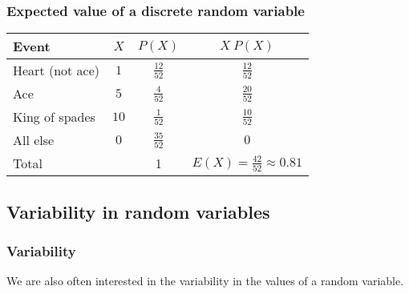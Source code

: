 \documentclass[slidestop,compress,mathserif]{beamer}
\begin{document}
\begin{frame}
\frametitle{Expected value of a discrete random variable}


\begin{center}
\renewcommand{\arraystretch}{1.5}
\begin{tabular}{l | c | c | c }
Event		& $X$ 		& $P(X)$        		& $X ~ P(X)$ \\
\hline
Heart (not ace)	& $1$		& $\frac{12}{52}$	& $\frac{12}{52}$ \\
Ace			& $5$		& $\frac{4}{52}$	& $\frac{20}{52}$ \\	
King of spades	& $10$		& $\frac{1}{52}$	& $\frac{10}{52}$ \\	
All else		& $0$		& $\frac{35}{52}$	& $0$ \\
\hline
Total			&			&		1		& $E(X) = \frac{42}{52} \approx 0.81$
\end{tabular}

\end{center}

\end{frame}


\subsection{Variability in random variables}


\begin{frame}
\frametitle{Variability}

We are also often interested in the variability in the values of a random variable.

\formula{
\[ \sigma^2 = Var(X) = \sum_{i = 1}^k (x_i - E(X))^2 P(X = x_i) \]
\[ \sigma = SD(X) = \sqrt{Var(X)} \]
}

\end{frame}

\end{document}
